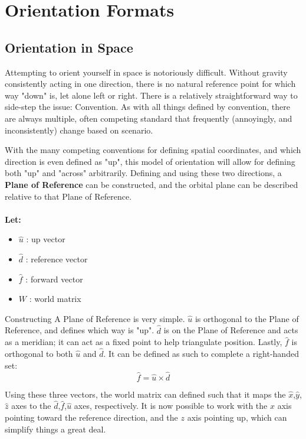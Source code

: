\section{Orientation Formats}
	\subsection{Orientation in Space}
		Attempting to orient yourself in space is notoriously difficult. Without gravity consistently acting in one direction, there is no natural reference point for which way "down" is, let alone left or right. There is a relatively straightforward way to side-step the issue: Convention. As with all things defined by convention, there are always multiple, often competing standard that frequently (annoyingly, and inconsistently) change based on scenario.
		
		With the many competing conventions for defining spatial coordinates, and which direction is even defined as "up", this model of orientation will allow for defining both "up" and "across" arbitrarily. Defining and using these two directions, a \textbf{Plane of Reference} can be constructed, and the orbital plane can be described relative to that Plane of Reference.
		\\\\
		\newcommand{\uv}{\hat{u}} %
		\newcommand{\dv}{\hat{d}} %
		\newcommand{\fv}{\hat{f}} %
		\newcommand{\wm}{W}
		\textbf{Let: }
		\begin{multicols}{2}
		\begin{itemize}
			\item $\uv$ : up vector
			\item $\dv$ : reference vector
			\item $\fv$ : forward vector
			\item $\wm$ : world matrix
		\end{itemize}
		\end{multicols}
	
		Constructing A Plane of Reference is very simple. $\uv$ is orthogonal to the Plane of Reference, and defines which way is "up". $\dv$ is on the Plane of Reference and acts as a meridian; it can act as a fixed point to help triangulate position. Lastly, $\fv$ is orthogonal to both $\uv$ and $\dv$. It can be defined as such to complete a right-handed set:
		$$\fv = \uv \times \dv$$

		Using these three vectors, the world matrix can defined such that it maps the $\hat{x}$,$\hat{y}$,$\hat{z}$ axes to the $\dv$,$\fv$,$\uv$ axes, respectively. It is now possible to work with the $x$ axis pointing toward the reference direction, and the $z$ axis pointing up, which can simplify things a great deal.
		
